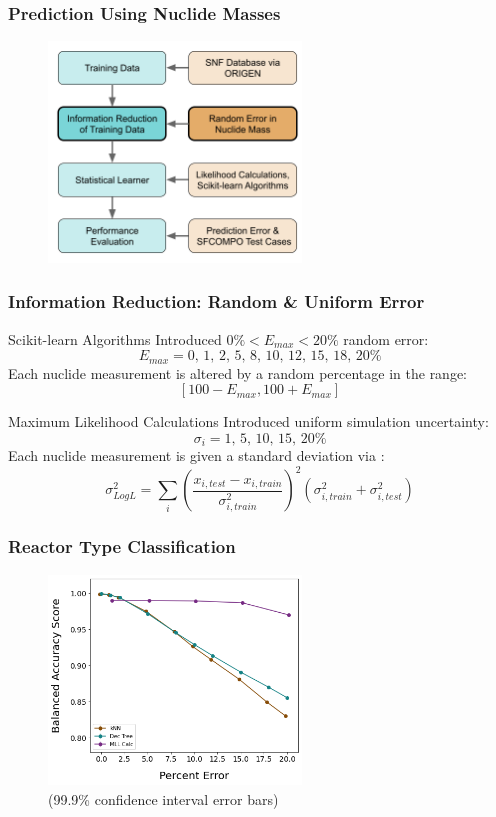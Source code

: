 
\begin{frame}
  \frametitle{Prediction Using Nuclide Masses}
  \begin{figure}
    \centering
    \includegraphics[width=0.6\textwidth]{./figures/methodology1_pres.png}
  \end{figure}
\end{frame}

\begin{frame}
  \frametitle{Information Reduction: Random \& Uniform Error}
  \begin{block}{Scikit-learn Algorithms}
    \small
    Introduced $0\% < E_{max} < 20\%$ random error:
    \[E_{max} = \text{0, 1, 2, 5, 8, 10, 12, 15, 18, 20}\% \]
    Each nuclide measurement is altered by a random percentage in the range: 
    \[[100-E_{max},100+E_{max}]\]
  \end{block}
  \begin{block}{Maximum Likelihood Calculations}
  \small
    Introduced uniform simulation uncertainty: 
    \[\sigma_i = \text{1, 5, 10, 15, 20}\% \]
    Each nuclide measurement is given a standard deviation via 
    \cite{mll_sensitivity}:
    \[\sigma_{Log L}^2 = \sum_i \left( 
                                \frac{x_{i,test} - x_{i,train}}{\sigma_{i,train}^2}
                                \right)^2 
                                (\sigma_{i,train}^2 + \sigma_{i,test}^2)
    \]
  \end{block}
\end{frame}

\begin{frame}
  \frametitle{Reactor Type Classification}
    \begin{figure}
      \centering
      \includegraphics[width=0.6\textwidth]{./figures/randerr_compare_nuc29_BalAcc_rxtr.png}
      \\ \scriptsize (99.9\% confidence interval error bars)
    \end{figure}
\end{frame}


